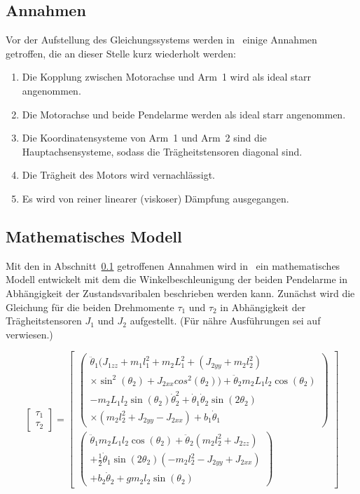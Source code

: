 \subsection{Annahmen}
\label{sub.sub.Annahmen}
Vor der Aufstellung des Gleichungssystems werden in~\cite{Cazzolato.2011} einige Annahmen getroffen, die an dieser Stelle kurz wiederholt werden:
\begin{enumerate}
\item Die Kopplung zwischen Motorachse und Arm~1 wird als ideal starr angenommen.
\item Die Motorachse und beide Pendelarme werden als ideal starr angenommen.
\item Die Koordinatensysteme von Arm~1 und Arm~2 sind die Hauptachsensysteme, sodass die Trägheitstensoren diagonal sind.
\item Die Trägheit des Motors wird vernachlässigt. %
\item Es wird von reiner linearer (viskoser) Dämpfung ausgegangen.
\end{enumerate}

\subsection{Mathematisches Modell}
\label{sub.sub.Mathematisches-Modell}
Mit den in Abschnitt~\ref{sub.sub.Annahmen} getroffenen Annahmen wird in~\cite{Cazzolato.2011} ein mathematisches Modell entwickelt mit dem die Winkelbeschleunigung der beiden Pendelarme in Abhängigkeit der Zustands\-varibalen beschrieben werden kann. 
Zunächst wird die Gleichung für die beiden Drehmomente $\tau_1$ und $\tau_2$ in Abhängigkeit der Trägheitstensoren $J_1$ und $J_2$ aufgestellt.
(Für nähre Ausführungen sei auf~\cite{Cazzolato.2011} verwiesen.)

\begin{equation}
\label{eqn.TauComplex}
\begin{bmatrix}
\tau_1 \\
\tau_2
\end{bmatrix}
=
\begin{bmatrix}
\begin{pmatrix}
\ddot{\theta}_1(J_{1zz}+m_1l^2_1+m_2L^2_1+(J_{2yy}+m_2l^2_2) 						\\
\times \sin^2(\theta_2)+J_{2xx}cos^2(\theta_2))+\ddot{\theta}_2m_2L_1l_2\cos(\theta_2)			\\
-m_2L_1l_2\sin(\theta_2)\dot{\theta}^2_2+\dot{\theta}_1\dot{\theta}_2\sin(2\theta_2)	\\
\times(m_2l^2_2+J_{2yy}-J_{2xx})+b_1\dot{\theta}_1
\end{pmatrix}
\\
\begin{pmatrix}
\ddot{\theta}_1m_2L_1l_2\cos(\theta_2)+\ddot{\theta}_2(m_2l^2_2+J_{2zz})	\\
+\frac{1}{2}\dot{\theta}_1\sin(2\theta_2)(-m_2l^2_2-J_{2yy}+J_{2xx})						\\
+b_2\dot{\theta}_2+gm_2l_2\sin(\theta_2)
\end{pmatrix}
\end{bmatrix}
\end{equation}

